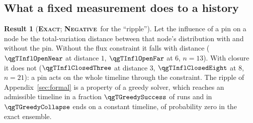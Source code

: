 \documentclass[11pt]{article}
\newcommand{\exact}{\textbf{\textsc{Exact}}}
\newcommand{\negres}{\textbf{\textsc{Negative}}}
\theoremstyle{definition}
\newtheorem{result}{Result}
\begin{document}
\subsection{What a fixed measurement does to a history}\label{sec:staged-history}
\begin{result}[\exact; \negres\ for the ``ripple'']\label{res:influence}
Let the influence of a pin on a node be the total-variation distance between that node's distribution with and without the pin. Without the flux constraint it falls with distance ($\qgTInflOpenNear$ at distance $1$, $\qgTInflOpenFar$ at $6$, $n=13$). With closure it does not ($\qgTInflClosedThree$ at distance $3$, $\qgTInflClosedEight$ at $8$, $n=21$): a pin acts on the whole timeline through the constraint. The ripple of Appendix~\ref{sec:formal} is a property of a greedy solver, which reaches an admissible timeline in a fraction $\qgTGreedySuccess$ of runs and in $\qgTGreedyCollapse$ ends on a constant timeline, of probability zero in the exact ensemble.
\end{result}
\end{document}
